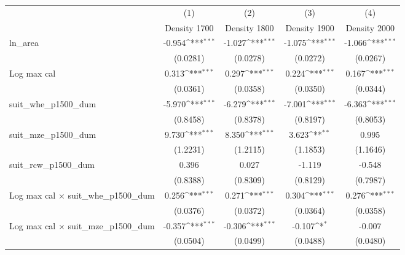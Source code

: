{
\def\sym#1{\ifmmode^{#1}\else\(^{#1}\)\fi}
\begin{tabular}{l*{4}{c}}
\toprule
                    &\multicolumn{1}{c}{(1)}&\multicolumn{1}{c}{(2)}&\multicolumn{1}{c}{(3)}&\multicolumn{1}{c}{(4)}\\
                    &\multicolumn{1}{c}{Density 1700}&\multicolumn{1}{c}{Density 1800}&\multicolumn{1}{c}{Density 1900}&\multicolumn{1}{c}{Density 2000}\\
\midrule
ln\_area             &      -0.954\sym{***}&      -1.027\sym{***}&      -1.075\sym{***}&      -1.066\sym{***}\\
                    &    (0.0281)         &    (0.0278)         &    (0.0272)         &    (0.0267)         \\
\addlinespace
Log max cal         &       0.313\sym{***}&       0.297\sym{***}&       0.224\sym{***}&       0.167\sym{***}\\
                    &    (0.0361)         &    (0.0358)         &    (0.0350)         &    (0.0344)         \\
\addlinespace
suit\_whe\_p1500\_dum  &      -5.970\sym{***}&      -6.279\sym{***}&      -7.001\sym{***}&      -6.363\sym{***}\\
                    &    (0.8458)         &    (0.8378)         &    (0.8197)         &    (0.8053)         \\
\addlinespace
suit\_mze\_p1500\_dum  &       9.730\sym{***}&       8.350\sym{***}&       3.623\sym{**} &       0.995         \\
                    &    (1.2231)         &    (1.2115)         &    (1.1853)         &    (1.1646)         \\
\addlinespace
suit\_rcw\_p1500\_dum  &       0.396         &       0.027         &      -1.119         &      -0.548         \\
                    &    (0.8388)         &    (0.8309)         &    (0.8129)         &    (0.7987)         \\
\addlinespace
Log max cal $\times$ suit\_whe\_p1500\_dum&       0.256\sym{***}&       0.271\sym{***}&       0.304\sym{***}&       0.276\sym{***}\\
                    &    (0.0376)         &    (0.0372)         &    (0.0364)         &    (0.0358)         \\
\addlinespace
Log max cal $\times$ suit\_mze\_p1500\_dum&      -0.357\sym{***}&      -0.306\sym{***}&      -0.107\sym{*}  &      -0.007         \\
                    &    (0.0504)         &    (0.0499)         &    (0.0488)         &    (0.0480)         \\

\end{tabular}}
